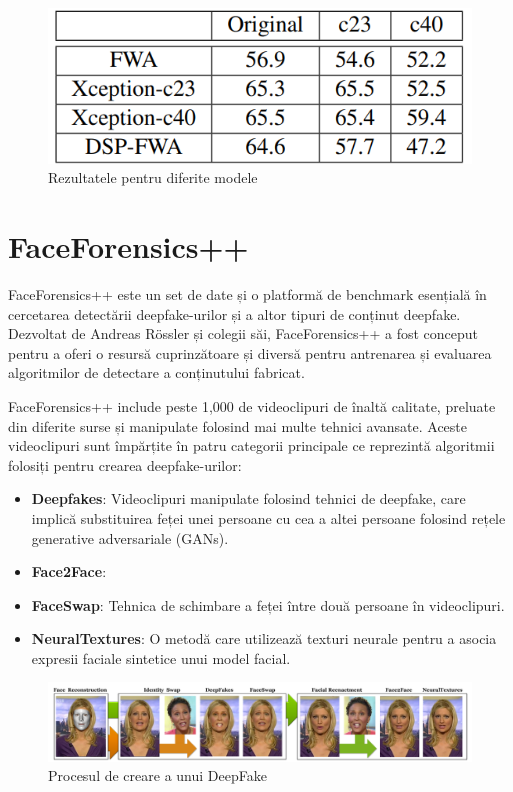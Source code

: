 \begin{figure}[h]
     \centering 
     \includegraphics[width=0.5\linewidth]{images/celeb-df_results.png}
     \captionsetup{font=footnotesize}
     \caption{Rezultatele pentru diferite modele \cite{li2020celeb}}
\end{figure}


\section{FaceForensics++}

FaceForensics++ este un set de date și o platformă de benchmark esențială în cercetarea detectării deepfake-urilor și a altor tipuri de conținut deepfake. Dezvoltat de Andreas Rössler și colegii săi, FaceForensics++ a fost conceput pentru a oferi o resursă cuprinzătoare și diversă pentru antrenarea și evaluarea algoritmilor de detectare a conținutului fabricat. 

FaceForensics++ include peste 1,000 de videoclipuri de înaltă calitate, preluate din diferite surse și manipulate folosind mai multe tehnici avansate. Aceste videoclipuri sunt împărțite în patru categorii principale ce reprezintă algoritmii folosiți pentru crearea deepfake-urilor:

\begin{itemize}
    \item \textbf{Deepfakes}: Videoclipuri manipulate folosind tehnici de deepfake, care implică substituirea feței unei persoane cu cea a altei persoane folosind rețele generative adversariale (GANs).
    \item \textbf{Face2Face}\cite{thies2016face2face}:
    \item \textbf{FaceSwap}: Tehnica de schimbare a feței între două persoane în videoclipuri.
    \item \textbf{NeuralTextures}\cite{thies2019deferred}: O metodă care utilizează texturi neurale pentru a asocia expresii faciale sintetice unui model facial.
    
\end{itemize}

\begin{figure}[h]
     \centering 
     \includegraphics[width=\linewidth]{images/faceforensics.png}
     \captionsetup{font=footnotesize}
     \caption{Procesul de creare a unui DeepFake \cite{rössler2019faceforensics}}
\end{figure}

